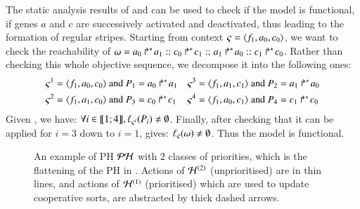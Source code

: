The static analysis results of  and  can be used to check if the model is functional, \ie
if genes $a$ and $c$ are successively activated and deactivated,
thus leading to the formation of regular stripes.
Starting from context $\varsigma = \mbox{$\langle f_1, a_0, c_0 \rangle$}$,
we want to check the reachability of
$\omega = \mbox{$a_0\Rsh^*\!a_1$} :: \mbox{$c_0\Rsh^*\!c_1$} :: \mbox{$a_1\Rsh^*\!a_0$} :: \mbox{$c_1\Rsh^*\!c_0$}$.
Rather than checking this whole objective sequence,
we decompose it into the following ones:
\begin{align*}
  \varsigma^1 &= \mbox{$\langle f_1, a_0, c_0 \rangle$} \text{ and } P_1 = \mbox{$a_0\Rsh^*\!a_1$} &
  \varsigma^3 &= \mbox{$\langle f_1, a_1, c_1 \rangle$} \text{ and } P_2 = \mbox{$a_1\Rsh^*\!a_0$} \\
  \varsigma^2 &= \mbox{$\langle f_1, a_1, c_0 \rangle$} \text{ and } P_3 = \mbox{$c_0\Rsh^*\!c_1$} &
  \varsigma^4 &= \mbox{$\langle f_1, a_0, c_1 \rangle$} \text{ and } P_4 = \mbox{$c_1\Rsh^*\!c_0$}
\end{align*}
Given , we have: $\forall i \in \llbracket 1; 4 \rrbracket, \ell_{\varsigma^i}(P_i) \neq \emptyset$.
Finally, after checking that it can be applied for $i = 3$ down to $i = 1$,
 gives: $\ell_\varsigma(\omega) \neq \emptyset$.
Thus the model is functional.

\begin{figure}[htp]
  \centering
  \caption{
  \label{fig:metazoan-ph}
    An example of PH $\mathcal{PH}$ with $2$ classes of priorities,
    which is the flattening of the PH in .
    Actions of $\mathcal{H}^{(2)}$ (unprioritised) are in thin lines,
    and actions of $\mathcal{H}^{(1)}$ (prioritised) which are used to update cooperative sorts,
    are abstracted by thick dashed arrows.
  }
\end{figure}

